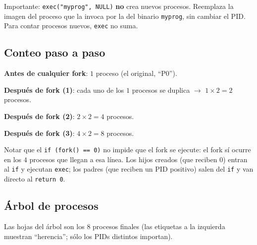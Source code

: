 \documentclass[11pt,a4paper]{article}
\begin{document}
Importante: \texttt{exec("myprog", NULL)} \textbf{no} crea nuevos
procesos. Reemplaza la imagen del proceso que la invoca por la del
binario \texttt{myprog}, sin cambiar el PID. Para contar procesos
nuevos, \texttt{exec} no suma.

\subsection*{Conteo paso a paso}

\textbf{Antes de cualquier fork}: $1$ proceso (el original, ``P0'').

\textbf{Después de fork (1)}: cada uno de los $1$ procesos se duplica
$\to$ $1 \times 2 = 2$ procesos.

\textbf{Después de fork (2)}: $2 \times 2 = 4$ procesos.

\textbf{Después de fork (3)}: $4 \times 2 = 8$ procesos.

Notar que el \texttt{if (fork() == 0)} no impide que el fork se
ejecute: el fork sí ocurre en los $4$ procesos que llegan a esa
línea. Los hijos creados (que reciben $0$) entran al \texttt{if} y
ejecutan \texttt{exec}; los padres (que reciben un PID positivo)
salen del \texttt{if} y van directo al \texttt{return 0}.

\subsection*{Árbol de procesos}

\begin{center}
\end{center}

Las hojas del árbol son los $8$ procesos finales (las etiquetas a la
izquierda muestran ``herencia''; sólo los PIDs distintos importan).
\end{document}
